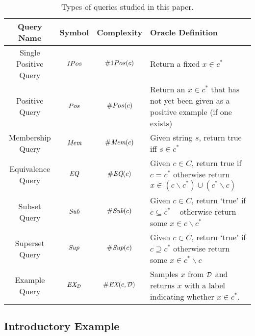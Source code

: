 \begin{table}
\begin{center}
  \begin{tabularx}{\textwidth}{| c | c | c | X | }
    \hline
    Query Name & Symbol & Complexity & Oracle Definition \\ \hline
    Single Positive Query & $\emph{1}Pos$ & $\oneposC(c)$ & Return a fixed $x \in c^*$ \\ \hline
    Positive Query & $Pos$ & $\#Pos(c)$ & Return an $x\in c^*$ that has not yet been given as a positive example (if one exists)\\ \hline
    Membership Query & $\emph{Mem}$ & $\#\emph{Mem}(c)$ & Given string $s$, return true iff $s \in c^*$ \\ \hline
    Equivalence Query & $\emph{EQ}$ & $\#\emph{EQ}(c)$ & Given $c \in C$, return true if $c=c^*$ otherwise return $x \in (c \backslash c^*) \cup (c^* \backslash c)$\\ \hline 
    Subset Query & $\emph{Sub}$ & $\#\emph{Sub}(c)$ & Given $c \in C$, return `true' if $c \subseteq c^*$ \mbox{  } otherwise return some $x \in c \backslash c^*$ \\ \hline
    Superset Query & $\emph{Sup}$ & $\#\emph{Sup}(c)$ & Given $c \in C$, return `true' if $c \supseteq c^*$  otherwise return some $x \in c^* \backslash c$\\ \hline
    Example Query & $\emph{EX}_{\mathcal{D}}$ & $\#\emph{EX}(c, \mathcal{D})$ & Samples $x$ from $\mathcal{D}$ and returns $x$ with a label indicating whether $x \in c^*$. \\ \hline
  \end{tabularx}
\end{center}
\caption{Types of queries studied in this paper.}
\label{table:queries}
\end{table}

\subsection{Introductory Example}


